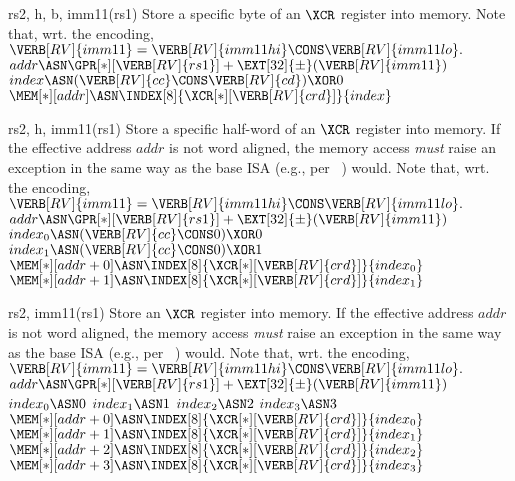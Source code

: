 
 {rs2, h, b, imm11(rs1)}{
  Store a specific      byte of an $\XCR$ register into memory.
  Note that, wrt. the encoding,
  $
  \VERB[RV]{imm11} = \VERB[RV]{imm11hi} \CONS \VERB[RV]{imm11lo} .
  $
}{
  $addr            \ASN \GPR[*][{\VERB[RV]{rs1}}] + \EXT[32]{\pm}( \VERB[RV]{imm11} )$ \;
  $index           \ASN ( \VERB[RV]{cc} \CONS \VERB[RV]{cd} ) \XOR 0$ \;
  $\MEM[*][addr  ] \ASN \INDEX[8]{\XCR[*][{\VERB[RV]{crd}}]}{index  }$ \;
}


 {rs2, h,    imm11(rs1)}{
  Store a specific half-word of an $\XCR$ register into memory.
  If the effective address $addr$ is not      word aligned, 
  the memory access {\em must} raise an exception in the same way
  as the base ISA 
  (e.g., per ~\cite[Section 2.6]{SCARV:RV:ISA:I:17})
  would.
  Note that, wrt. the encoding,
  $
  \VERB[RV]{imm11} = \VERB[RV]{imm11hi} \CONS \VERB[RV]{imm11lo} .
  $
}{
  $addr            \ASN \GPR[*][{\VERB[RV]{rs1}}] + \EXT[32]{\pm}( \VERB[RV]{imm11} )$ \;
  $index_0         \ASN ( \VERB[RV]{cc} \CONS             0 ) \XOR 0 $ \;
  $index_1         \ASN ( \VERB[RV]{cc} \CONS             0 ) \XOR 1 $ \;
  $\MEM[*][addr+0] \ASN \INDEX[8]{\XCR[*][{\VERB[RV]{crd}}]}{index_0}$ \;
  $\MEM[*][addr+1] \ASN \INDEX[8]{\XCR[*][{\VERB[RV]{crd}}]}{index_1}$ \;
}


 {rs2,       imm11(rs1)}{
  Store                         an $\XCR$ register into memory.
  If the effective address $addr$ is not      word aligned, 
  the memory access {\em must} raise an exception in the same way
  as the base ISA 
  (e.g., per ~\cite[Section 2.6]{SCARV:RV:ISA:I:17})
  would.
  Note that, wrt. the encoding,
  $
  \VERB[RV]{imm11} = \VERB[RV]{imm11hi} \CONS \VERB[RV]{imm11lo} .
  $
}{
  $addr            \ASN \GPR[*][{\VERB[RV]{rs1}}] + \EXT[32]{\pm}( \VERB[RV]{imm11} )$ \;
  $index_0         \ASN                                            0 $ \;
  $index_1         \ASN                                            1 $ \;
  $index_2         \ASN                                            2 $ \;
  $index_3         \ASN                                            3 $ \;
  $\MEM[*][addr+0] \ASN \INDEX[8]{\XCR[*][{\VERB[RV]{crd}}]}{index_0}$ \;
  $\MEM[*][addr+1] \ASN \INDEX[8]{\XCR[*][{\VERB[RV]{crd}}]}{index_1}$ \;
  $\MEM[*][addr+2] \ASN \INDEX[8]{\XCR[*][{\VERB[RV]{crd}}]}{index_2}$ \;
  $\MEM[*][addr+3] \ASN \INDEX[8]{\XCR[*][{\VERB[RV]{crd}}]}{index_3}$ \;
}

